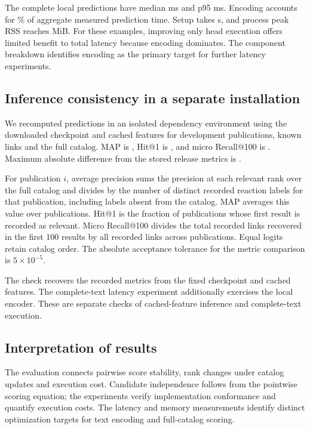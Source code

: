 \documentclass[preprint,12pt,a4paper]{elsarticle}
\begin{document}
The \EndRequests{} complete local predictions have median \EndMedian{} ms and p95
\EndPninetyfive{} ms. Encoding accounts for \EncodingShare\% of aggregate measured
prediction time. Setup takes \SetupSeconds{} s, and process peak RSS reaches
\EndMemory{} MiB. For these examples, improving only head execution offers limited benefit
to total latency because encoding dominates. The component breakdown identifies encoding as the primary target for
further latency experiments.

\subsection{Inference consistency in a separate installation}
We recomputed predictions in an isolated dependency environment using the
downloaded checkpoint and cached features for \PublicationCount{} development publications,
\KnownLinks{} known links and the full catalog. MAP is \MeasuredMAP{}, Hit@1 is
\MeasuredHit{}, and micro Recall@100 is \MeasuredRecall{}. Maximum absolute
difference from the stored release metrics is \MetricError{}.

For publication $i$, average precision sums the precision at each relevant
rank over the full catalog and divides by the number of distinct recorded
reaction labels for that publication, including labels absent from the catalog.
MAP averages this value over publications. Hit@1 is the fraction of publications
whose first result is recorded as relevant. Micro Recall@100 divides the total
recorded links recovered in the first 100 results by all recorded links across
publications. Equal logits retain catalog order. The absolute acceptance tolerance for the metric comparison is
$5\times10^{-5}$.

The check recovers the recorded metrics from the fixed checkpoint and cached
features. The complete-text latency experiment additionally exercises the local
encoder. These are separate checks of cached-feature inference and complete-text
execution.
\subsection{Interpretation of results}

The evaluation connects pairwise score stability, rank changes under catalog
updates and execution cost. Candidate independence follows from the pointwise
scoring equation; the experiments verify implementation conformance and quantify
execution costs. The latency and memory measurements identify distinct
optimization targets for text encoding and full-catalog scoring.
\end{document}
